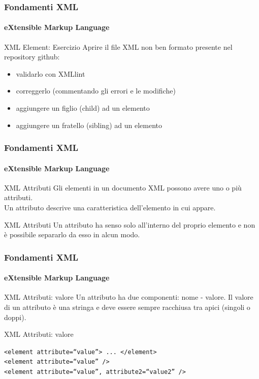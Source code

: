 \begin{frame}
    \frametitle{Fondamenti XML}
    \framesubtitle{eXtensible Markup Language}
    \addtocounter{nframe}{1}

	\begin{block}{XML Element: Esercizio}
		Aprire il file XML non ben formato presente nel repository github:
		\begin{itemize}
			\item validarlo con XMLlint
			\item correggerlo (commentando gli errori e le modifiche)
			\item aggiungere un figlio (child) ad un elemento
			\item aggiungere un fratello (sibling) ad un elemento
		\end{itemize}
	\end{block}

\end{frame}


\begin{frame}
    \frametitle{Fondamenti XML}
    \framesubtitle{eXtensible Markup Language}
    \addtocounter{nframe}{1}

	\begin{block}{XML Attributi}
		Gli elementi in un documento XML possono avere uno o più attributi.
		\\ Un attributo descrive una caratteristica dell'elemento in cui appare.
	\end{block}

	\begin{block}{XML Attributi}
		Un attributo ha senso solo all'interno del proprio elemento e non è possibile separarlo da esso in alcun modo.
	\end{block}

\end{frame}


\begin{frame}
    \frametitle{Fondamenti XML}
    \framesubtitle{eXtensible Markup Language}
    \addtocounter{nframe}{1}

	\begin{block}{XML Attributi: valore}
		Un attributo ha due componenti: nome - valore.
		Il valore di un attributo è una stringa e deve essere sempre racchiusa tra apici (singoli o doppi).
	\end{block}

	\begin{block}{XML Attributi: valore}
		\begin{center}
			\texttt{<element attribute=``value''> ... </element>}
			\\\texttt{<element attribute=``value'' />}
			\\\texttt{<element attribute=``value'', attribute2=``value2'' />}
		\end{center}
	\end{block}

\end{frame}


